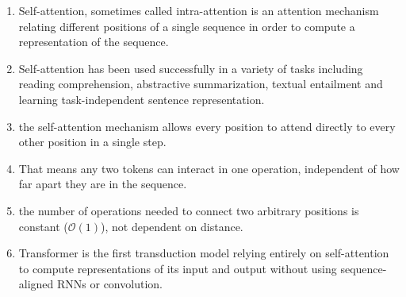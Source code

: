 \begin{enumerate}
    \item Self-attention, sometimes called intra-attention is an attention mechanism relating different positions of a single sequence in order to compute a representation of the sequence. 
    \hfill \cite{arxiv/1706.03762/Attention-Is-All-You-Need}

    \item Self-attention has been used successfully in a variety of tasks including reading comprehension, abstractive summarization, textual entailment and learning task-independent sentence representation.
    \hfill \cite{arxiv/1706.03762/Attention-Is-All-You-Need}

    \item the self-attention mechanism allows every position to attend directly to every other position in a single step.
    \hfill \cite{common/online/chatgpt}

    \item That means any two tokens can interact in one operation, independent of how far apart they are in the sequence.
    \hfill \cite{common/online/chatgpt}

    \item the number of operations needed to connect two arbitrary positions is constant ($\mathcal{O}(1)$), not dependent on distance.
    \hfill \cite{common/online/chatgpt}

    \item Transformer is the first transduction model relying entirely on self-attention to compute representations of its input and output without using sequence-aligned RNNs or convolution. 
    \hfill \cite{arxiv/1706.03762/Attention-Is-All-You-Need}
\end{enumerate}






















